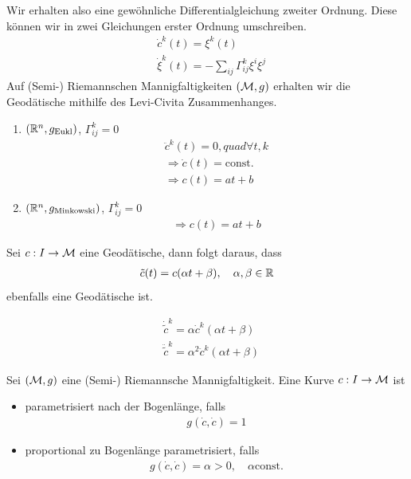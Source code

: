 Wir erhalten also eine gewöhnliche Differentialgleichung zweiter Ordnung.
Diese können wir in zwei Gleichungen erster Ordnung umschreiben.
\begin{align}
&\dot{c}^k (t) = \xi^k(t)\\
&\dot{\xi}^k (t) = - \sum_{ij} \Gamma^k_{ij} \xi^i \xi^j
\end{align}
Auf (Semi-) Riemannschen Mannigfaltigkeiten $(\mathcal{M}, g)$ erhalten wir die Geodätische mithilfe des Levi-Civita Zusammenhanges.
\begin{bsp}
\begin{enumerate}
\item $(\mathbb{R}^n, g_{\mathrm{Eukl}})$, $\Gamma^k_{ij}= 0$
\begin{align*}
\ddot{c}^k(t) = 0, quad \forall t, k\\
\Rightarrow \dot{c}(t) = \mathrm{const.}\\
\Rightarrow c(t) = a t + b
\end{align*}
\item $(\mathbb{R}^n, g_{\mathrm{Minkowski}})$, $\Gamma^k_{ij}= 0$
\begin{align*}
\Rightarrow c(t) = a t + b
\end{align*}
\end{enumerate}
\end{bsp} 
\begin{lem}
\label{lem:geolinear}
Sei $c: I \to \mathcal{M}$ eine Geodätische, dann folgt daraus, dass 
\begin{align}
\tilde{c}(t) = c(\alpha t + \beta), \quad \alpha, \beta \in \mathbb{R}
\end{align}
ebenfalls eine Geodätische ist.
\end{lem}
\begin{bew}
\begin{align}
&\dot{\tilde{c}}^k = \alpha \dot{c}^k (\alpha t + \beta)\\
& \ddot{\tilde{c}}^k = \alpha^2 \ddot{c}^k (\alpha t + \beta)
\end{align}
\end{bew}
\begin{defs}
Sei $(\mathcal{M}, g)$ eine (Semi-) Riemannsche Mannigfaltigkeit.
Eine Kurve $c: I \to \mathcal{M}$ ist
\begin{itemize}
\item parametrisiert nach der Bogenlänge, falls
\begin{align}
g(\dot{c}, \dot{c}) = 1
\end{align}
\item proportional zu Bogenlänge parametrisiert, falls
\begin{align}
g(\dot{c}, \dot{c}) = \alpha > 0, \quad \alpha \mathrm{const.}
\end{align}
\end{itemize}
\end{defs}
